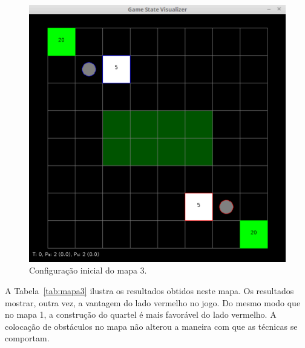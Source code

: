 \begin{figure}[ht]
	\centering
	\includegraphics[width=.5\textwidth]{fig/map8x8obsta.pdf}
	\caption{Configuração inicial do mapa 3.}
	\label{fig:mapa8x8obsta}
\end{figure}

A Tabela~\ref{tab:mapa3} ilustra os resultados obtidos neste mapa.
Os resultados mostrar, outra vez, a vantagem do lado vermelho no jogo.
Do mesmo modo que no mapa 1, a construção do quartel é mais favorável do lado vermelho.
A colocação de obstáculos no mapa não alterou a maneira com que as técnicas se comportam.

